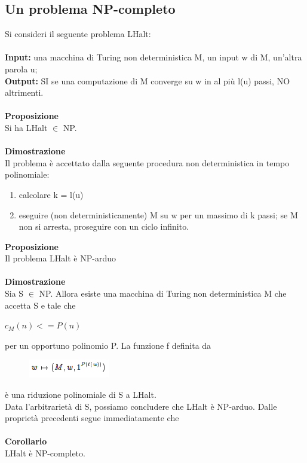 \subsection{Un problema NP-completo}
Si consideri il seguente problema LHalt:\\\\
\textbf{Input:} una macchina di Turing non deterministica M, un input w di
M, un’altra parola u;\\
\textbf{Output:} SI se una computazione di M converge su w in al più l(u) passi, NO altrimenti.\\\\
\textbf{Proposizione}\\
Si ha LHalt $\in$ NP.\\\\
\textbf{Dimostrazione}\\
Il problema è accettato dalla seguente procedura non deterministica in
tempo polinomiale:
\begin{enumerate}
    \item calcolare k = l(u)
    
    \item eseguire (non deterministicamente) M su w per un massimo di k passi; se M non si arresta, proseguire con un ciclo infinito.
\end{enumerate}
\textbf{Proposizione}\\
Il problema LHalt è NP-arduo\\\\
\textbf{Dimostrazione}\\
Sia S $\in$ NP. Allora esiste una macchina di Turing non deterministica M che accetta S e tale che
\begin{center}
    $c_M(n) <= P(n)$
\end{center}
per un opportuno polinomio P. La funzione f definita da
\begin{figure}[htp]
    \centering
    \includegraphics[scale=0.9]{tesi_stile/img/foto2cap12.png}
\end{figure}
è una riduzione polinomiale di S a LHalt.\\
Data l’arbitrarietà di S, possiamo concludere che LHalt è NP-arduo.
Dalle proprietà precedenti segue immediatamente che\\\\
\textbf{Corollario}\\
LHalt è NP-completo.
